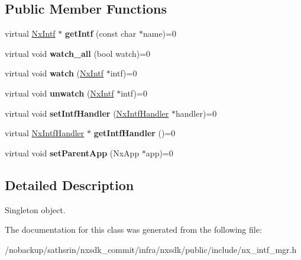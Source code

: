 \subsection*{Public Member Functions}
\begin{DoxyCompactItemize}
\item 
\hypertarget{classnxos_1_1NxIntfMgr_a40160d053d4fee1aa11362074636048e}{virtual \hyperlink{classnxos_1_1NxIntf}{Nx\-Intf} $\ast$ {\bfseries get\-Intf} (const char $\ast$name)=0}\label{classnxos_1_1NxIntfMgr_a40160d053d4fee1aa11362074636048e}

\item 
\hypertarget{classnxos_1_1NxIntfMgr_a2d8526023a86bcad91b592150f163b5d}{virtual void {\bfseries watch\-\_\-all} (bool watch)=0}\label{classnxos_1_1NxIntfMgr_a2d8526023a86bcad91b592150f163b5d}

\item 
\hypertarget{classnxos_1_1NxIntfMgr_ad853c817b3cae6afa41cf85a2d08a4ed}{virtual void {\bfseries watch} (\hyperlink{classnxos_1_1NxIntf}{Nx\-Intf} $\ast$intf)=0}\label{classnxos_1_1NxIntfMgr_ad853c817b3cae6afa41cf85a2d08a4ed}

\item 
\hypertarget{classnxos_1_1NxIntfMgr_ab437a716ec538bfc2714881293c2b960}{virtual void {\bfseries unwatch} (\hyperlink{classnxos_1_1NxIntf}{Nx\-Intf} $\ast$intf)=0}\label{classnxos_1_1NxIntfMgr_ab437a716ec538bfc2714881293c2b960}

\item 
\hypertarget{classnxos_1_1NxIntfMgr_a738c23aaefc96b45f66de9691afe0624}{virtual void {\bfseries set\-Intf\-Handler} (\hyperlink{classnxos_1_1NxIntfHandler}{Nx\-Intf\-Handler} $\ast$handler)=0}\label{classnxos_1_1NxIntfMgr_a738c23aaefc96b45f66de9691afe0624}

\item 
\hypertarget{classnxos_1_1NxIntfMgr_a384483dad1bdcf5c51eb0b5037bf9481}{virtual \hyperlink{classnxos_1_1NxIntfHandler}{Nx\-Intf\-Handler} $\ast$ {\bfseries get\-Intf\-Handler} ()=0}\label{classnxos_1_1NxIntfMgr_a384483dad1bdcf5c51eb0b5037bf9481}

\item 
\hypertarget{classnxos_1_1NxIntfMgr_af6ed24dac368840908661db37eeed19c}{virtual void {\bfseries set\-Parent\-App} (Nx\-App $\ast$app)=0}\label{classnxos_1_1NxIntfMgr_af6ed24dac368840908661db37eeed19c}

\end{DoxyCompactItemize}


\subsection{Detailed Description}
Singleton object. 

The documentation for this class was generated from the following file\-:\begin{DoxyCompactItemize}
\item 
/nobackup/sathsrin/nxsdk\-\_\-commit/infra/nxsdk/public/include/nx\-\_\-intf\-\_\-mgr.\-h\end{DoxyCompactItemize}
